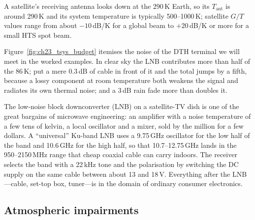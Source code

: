 A satellite's receiving antenna looks down at the 290\,K Earth, so its $T_{\text{ant}}$ is
around 290\,K and its system temperature is typically 500--1000\,K; satellite $G/T$ values range
from about $-10$\,dB/K for a global beam to $+20$\,dB/K or more for a small HTS spot beam.

Figure~\ref{fig:ch23_tsys_budget} itemises the noise of the DTH terminal we will meet in the worked
examples. In clear sky the LNB contributes more than half of the 86\,K; put a mere 0.3\,dB of cable
in front of it and the total jumps by a fifth, because a lossy component at room temperature both
weakens the signal and radiates its own thermal noise; and a 3\,dB rain fade more than doubles it.


\begin{inpractice}
The low-noise block downconverter (LNB) on a satellite-TV dish is one of the great bargains of
microwave engineering: an amplifier with a noise temperature of a few tens of kelvin, a local
oscillator and a mixer, sold by the million for a few dollars. A ``universal'' Ku-band LNB uses a
9.75\,GHz oscillator for the low half of the band and 10.6\,GHz for the high half, so that
10.7--12.75\,GHz lands in the 950--2150\,MHz range that cheap coaxial cable can carry indoors. The
receiver selects the band with a 22\,kHz tone and the polarisation by switching the DC supply on
the same cable between about 13 and 18\,V. Everything after the LNB---cable, set-top box,
tuner---is in the domain of ordinary consumer electronics.
\end{inpractice}


\subsection{Atmospheric impairments}

